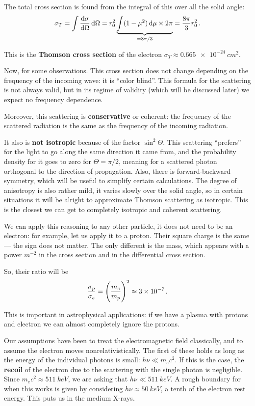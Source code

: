 \documentclass[main.tex]{subfiles}
\begin{document}
The total cross section is found from the integral of this over all the solid angle: 
%
\begin{align}
\sigma_T = \int \dv{\sigma }{\Omega } \dd{\Omega } = r_0^2 \underbrace{\int (1 - \mu^2) \dd{\mu } \times 2 \pi }_{= 8 \pi /3} = \frac{8 \pi }{3} r_0^2
\,.
\end{align}

This is the \textbf{Thomson cross section} of the electron \(\sigma_{T} \approx \SI{0.665e-24}{cm^2}\). 

Now, for some observations. This cross section does not change depending on the frequency of the incoming wave: it is ``color blind''.
This formula for the scattering is not always valid, but in its regime of validity (which will be discussed later) we expect no frequency dependence. 

Moreover, this scattering is \textbf{conservative} or coherent: the frequency of the scattered radiation is the same as the frequency of the incoming radiation.

It also is \textbf{not isotropic} because of the factor \(\sin^2 \Theta \). This scattering ``prefers'' for the light to go along the same direction it came from, and the probability density for it goes to zero for  \(\Theta = \pi /2\), meaning for a scattered photon orthogonal to the direction of propagation. 
Also, there is forward-backward symmetry, which will be useful to simplify certain calculations.
The degree of anisotropy is also rather mild, it varies slowly over the solid angle, so in certain situations it will be alright to approximate Thomson scattering as isotropic.
This is the closest we can get to completely isotropic and coherent scattering. 

We can apply this reasoning to any other particle, it does not need to be an electron: for example, let us apply it to a proton. 
Their square charge is the same --- the sign does not matter. The only different is the mass, which appears with a power \(m^{-2}\) in the cross section and in the differential cross section. 

So, their ratio will be 
%
\begin{align}
\frac{\sigma_{p}}{\sigma_{e}} = \qty( \frac{m_e}{m_p})^2 \approx \num{3e-7}
\,.
\end{align}

This is important in astrophysical applications: if we have a plasma with protons and electron we can almost completely ignore the protons. 

Our assumptions have been to treat the electromagnetic field classically, and to assume the electron moves nonrelativistically. 
The first of these holds as long as the energy of the individual photons is small: \(h \nu \ll m_e c^2\). If this is the case, the \textbf{recoil} of the electron due to the scattering with the single photon is negligible. 
Since \(m_e c^2 \approx \SI{511}{keV}\), we are asking that \(h \nu \ll \SI{511}{keV}\). 
A rough boundary for when this works is given by considering \(h \nu \approx \SI{50}{keV}\), a tenth of the electron rest energy. 
This puts us in the medium X-rays. 
\end{document}
